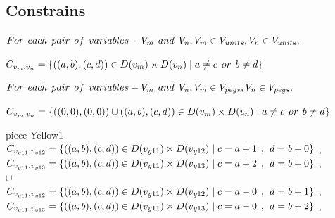 \subsection{Constrains}
 $For \hspace{1ex} each \hspace{1ex} pair\hspace{1ex} of \hspace{1ex}variables-V_{m} \hspace{1ex} and \hspace{1ex} V_{n}, V_{m} \in V_{units}, V_{n} \in V_{units},$
\begin{center}
$C_{v_{m},v_{n}}=\{((a,b),(c,d))\in D(v_{m}) \times D(v_{n})\mid a \neq c   \hspace{1ex} or \hspace{1ex}  b \neq d\}$
\end{center}
$For \hspace{1ex} each \hspace{1ex} pair \hspace{1ex} of\hspace{1ex} variables-V_{m}\hspace{1ex} and \hspace{1ex}V_{n}, V_{m} \in V_{pegs}, V_{n} \in V_{pegs},$
\begin{center}
$C_{v_{m},v_{n}}=\{((0,0),(0,0))\cup ((a,b),(c,d))\in D(v_{m})\times D(v_{n})\mid a \neq c   \hspace{1ex} or \hspace{1ex}  b \neq d\}$\\
\end{center}
 piece Yellow1
\\$C_{v_{y11},v_{y12}}=\{((a,b),(c,d))\in D(v_{y11})\times D(v_{y12})\mid c = a + 1\hspace{1ex} , \hspace{1ex}  d = b + 0 \}$ , 
\\$C_{v_{y11},v_{y13}}=\{((a,b),(c,d))\in D(v_{y11})\times D(v_{y13})\mid c = a + 2\hspace{1ex} , \hspace{1ex}  d = b + 0 \}$ , 
\\$\cup$
\\$C_{v_{y11},v_{y12}}=\{((a,b),(c,d))\in D(v_{y11})\times D(v_{y12})\mid c = a - 0\hspace{1ex} , \hspace{1ex}  d = b + 1 \}$ , 
\\$C_{v_{y11},v_{y13}}=\{((a,b),(c,d))\in D(v_{y11})\times D(v_{y13})\mid c = a - 0\hspace{1ex} , \hspace{1ex}  d = b + 2 \}$ , 
